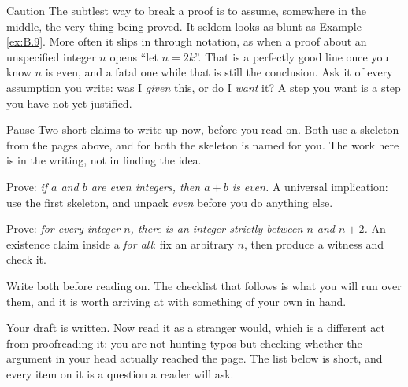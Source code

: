 \documentclass[a4paper,12pt,oneside]{memoir}
\begin{document}
\begin{envcaution}{Caution}{}{}
The subtlest way to break a proof is to assume, somewhere in the middle, the very thing being proved. It seldom looks as blunt as Example \ref{ex:B.9}. More often it slips in through notation, as when a proof about an unspecified integer \(n\) opens “let \(n = 2k\)”. That is a perfectly good line once you know \(n\) is even, and a fatal one while that is still the conclusion. Ask it of every assumption you write: was I \emph{given} this, or do I \emph{want} it? A step you want is a step you have not yet justified.
\end{envcaution}
\begin{envremark}{Pause}{}{}
Two short claims to write up now, before you read on. Both use a skeleton from the pages above, and for both the skeleton is named for you. The work here is in the writing, not in finding the idea.

\begin{steps}
  \item Prove: \emph{if \(a\) and \(b\) are even integers, then \(a + b\) is even.} A universal implication: use the first skeleton, and unpack \emph{even} before you do anything else.
  \item Prove: \emph{for every integer \(n\), there is an integer strictly between \(n\) and \(n + 2\).} An existence claim inside a \emph{for all}: fix an arbitrary \(n\), then produce a witness and check it.
\end{steps}
Write both before reading on. The checklist that follows is what you will run over them, and it is worth arriving at with something of your own in hand.
\end{envremark}
Your draft is written. Now read it as a stranger would, which is a different act from proofreading it: you are not hunting typos but checking whether the argument in your head actually reached the page. The list below is short, and every item on it is a question a reader will ask.
\end{document}
